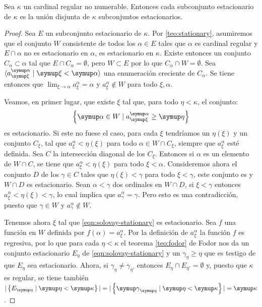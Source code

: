 \begin{teo}[Solovay]\label{teo:solovay}
    Sea $\kappa$ un cardinal regular no numerable. Entonces cada subconjunto estacionario
    de $\kappa$ es la unión disjunta de $\kappa$ subconjuntos estacionarios.
\end{teo}

\newcommand{\seqa}{a_\xi^\alpha}
\begin{proof}
    Sea $E$ un subconjunto estacionario de $\kappa$.
    Por \ref{teo:stationary}, asumiremos que el conjunto $W$
    consistente de todos los $\alpha\in E$ tales que $\alpha$ es cardinal
    regular y $E\cap\alpha$ no es estacionario en $\alpha$, es estacionario en $\kappa$.
    Existe entonces un conjunto \cna{} $C_\alpha\subset\alpha$ tal que $E\cap C_\alpha = \emptyset$,
    pero $W\subset E$ por lo que $C_\alpha\cap W=\emptyset$.
    Sea $\seq{\seqa\mid\xi<\alpha}$ una enumeración creciente de $C_\alpha$.
    Se tiene entonces que $\lim_{\xi\to\alpha}\seqa = \alpha$ y $\seqa\notin W$ para todo $\xi, \alpha$.

    Veamos, en primer lugar, que existe $\xi$ tal que, para todo $\eta<\kappa$, el conjunto:
    \begin{equation}\label{eqn:solovay-stationary}
        \set{\alpha\in W\mid \seqa\geq\eta}
    \end{equation}
    es estacionario. Si este no fuese el caso, para cada $\xi$ tendríamos un $\eta(\xi)$
    y un conjunto \cna{} $C_\xi$, tal que $\seqa < \eta(\xi)$ para todo $\alpha\in W\cap C_\xi$, siempre que $\seqa$
    esté definida. Sea $C$ la intersección diagonal de los $C_\xi$. Entonces si $\alpha$ es un elemento de
    $W\cap C$, se tiene que $\seqa < \eta(\xi)$ para todo $\xi<\alpha$. Consideremos ahora el conjunto $D$ de
    los $\gamma\in C$ tales que $\eta(\xi)<\gamma$ para todo $\xi<\gamma$, este conjunto es \cna{}
    y $W\cap D$ es estacionario. Sean $\alpha<\gamma$ dos ordinales en $W\cap D$,
    si $\xi<\gamma$ entonces $\seqa<\eta(\xi)<\gamma$, lo cual implica que $a_\gamma^\alpha = \gamma$.
    Pero esto es una contradicción, puesto que $\gamma\in W$ y $a_\gamma^\alpha\notin W$.

    Tenemos ahora $\xi$ tal que \ref{eqn:solovay-stationary} es estacionario.
    Sea $f$ una función en $W$ definida por $f(\alpha)=\seqa$. Por la definición de $\seqa$
    la función $f$ es regresiva, por lo que para cada $\eta<\kappa$ el teorema \ref{teo:fodor} de Fodor
    nos da un conjunto estacionario $E_\eta$ de \ref{eqn:solovay-stationary} y un $\gamma_\eta\geq\eta$
    que es testigo de que $E_\eta$ sea estacionario.
    Ahora, si $\gamma_\eta\neq\gamma_{\eta'}$ entonces $E_\eta\cap E_{\eta'} = \emptyset$ y, puesto que $\kappa$ es regular,
    se tiene también $|\set{E_\eta\mid\eta<\kappa}| = |\set{\gamma_\eta\mid\eta<\kappa}| = \kappa$.
\end{proof}

